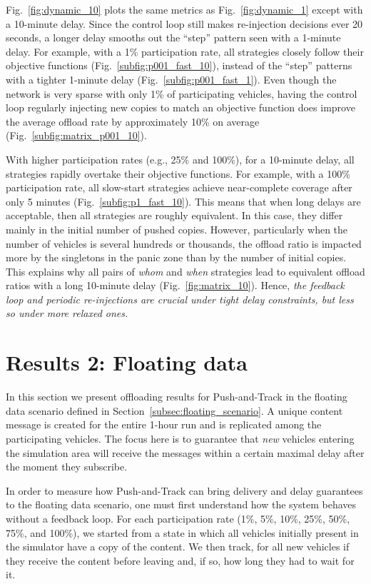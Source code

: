 \documentclass[preprint]{elsarticle}
\begin{document}
Fig.~\ref{fig:dynamic_10} plots the same metrics as Fig.~\ref{fig:dynamic_1} except with a 10-minute delay. Since the control loop still makes re-injection decisions ever 20 seconds, a longer delay smooths out the ``step'' pattern seen with a 1-minute delay. For example, with a 1\% participation rate, all strategies closely follow their objective functions (Fig.~\ref{subfig:p001_fast_10}), instead of the ``step'' patterns with a tighter 1-minute delay (Fig.~\ref{subfig:p001_fast_1}). Even though the network is very sparse with only 1\% of participating vehicles, having the control loop regularly injecting new copies to match an objective function does improve the average offload rate by approximately 10\% on average (Fig.~\ref{subfig:matrix_p001_10}).

With higher participation rates (e.g., 25\% and 100\%), for a 10-minute delay, all strategies rapidly overtake their objective functions. For example, with a 100\% participation rate, all slow-start strategies achieve near-complete coverage after only 5 minutes (Fig.~\ref{subfig:p1_fast_10}). This means that when long delays are acceptable, then all strategies are roughly equivalent. In this case, they differ mainly in the initial number of pushed copies. However, particularly when the number of vehicles is several hundreds or thousands, the offload ratio is impacted more by the singletons in the panic zone than by the number of initial copies. This explains why all pairs of \textit{whom} and \textit{when} strategies lead to equivalent offload ratios with a long 10-minute delay (Fig.~\ref{fig:matrix_10}). Hence, \emph{the feedback loop and periodic re-injections are crucial
under tight delay constraints, but less so under more relaxed ones.}


\section{Results 2: Floating data}
\label{sec:floating}

In this section we present offloading results for Push-and-Track in the floating data scenario defined in Section~\ref{subsec:floating_scenario}. A unique content message is created for the entire 1-hour run and is replicated among the participating vehicles. The focus here is to guarantee that \emph{new} vehicles entering the simulation area will receive the messages within a certain maximal delay after the moment they subscribe.

In order to measure how Push-and-Track can bring delivery and delay guarantees to the floating data scenario, one must first understand how the system behaves without a feedback loop. For each participation rate (1\%, 5\%, 10\%, 25\%, 50\%, 75\%, and 100\%), we started from a state in which all vehicles initially present in the simulator have a copy of the content. We then track, for all new vehicles if they receive the content before leaving and, if so, how long they had to wait for it.
\end{document}
